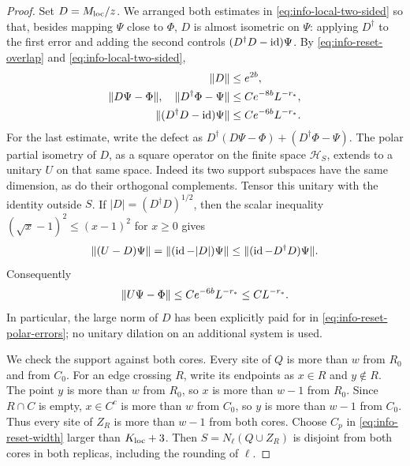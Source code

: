 \begin{proof}
Set $D=M_{\rm loc}/z$.  We arranged both estimates in
\eqref{eq:info-local-two-sided} so that, besides mapping $\Psi$ close
to $\Phi$, $D$ is almost isometric on $\Psi$: applying $D^\dagger$
to the first error and adding the second controls
$(D^\dagger D-\operatorname{id})\Psi$.  By
\eqref{eq:info-reset-overlap} and \eqref{eq:info-local-two-sided},
\begin{align}
 \lVert D\rVert&\le e^{2b},\\
 \lVert D\Psi-\Phi\rVert,\quad\lVert D^\dagger\Phi-\Psi\rVert
      &\le C e^{-8b}L^{-r_*},\\
 \lVert (D^\dagger D-\operatorname{id})\Psi\rVert
      &\le C e^{-6b}L^{-r_*}.
 \label{eq:info-reset-polar-errors}
\end{align}
For the last estimate, write the defect as
$D^\dagger(D\Psi-\Phi)+(D^\dagger\Phi-\Psi)$.
The polar partial isometry of $D$, as a square operator on the finite
space $\mathcal H_S$, extends to a unitary $U$ on that same space.
Indeed its two support subspaces have the same dimension, as do their
orthogonal complements.  Tensor this unitary with the identity outside
$S$.  If $|D|=(D^\dagger D)^{1/2}$, then the scalar inequality
$(\sqrt{x}-1)^2\le(x-1)^2$ for $x\ge0$ gives
\[
 \lVert (U-D)\Psi\rVert=\lVert (\operatorname{id}-|D|)\Psi\rVert
       \le\lVert (\operatorname{id}-D^\dagger D)\Psi\rVert.
\]
Consequently
\begin{equation}
 \lVert U\Psi-\Phi\rVert\le C e^{-6b}L^{-r_*}\le CL^{-r_*}.
 \label{eq:info-reset-unitary}
\end{equation}
In particular, the large norm of $D$ has been explicitly paid for in
\eqref{eq:info-reset-polar-errors}; no unitary dilation on an additional
system is used.

We check the support against both cores.  Every site of $Q$ is more
than $w$ from $R_0$ and from $C_0$.  For an edge crossing $R$, write its
endpoints as $x\in R$ and $y\notin R$.  The point $y$ is more than $w$
from $R_0$, so $x$ is more than $w-1$ from $R_0$.  Since $R\cap C$ is
empty, $x\in C^c$ is more than $w$ from $C_0$, so $y$ is more than
$w-1$ from $C_0$.  Thus every site of $Z_R$ is more than $w-1$ from
both cores.  Choose $C_p$ in \eqref{eq:info-reset-width} larger than
$K_{\rm loc}+3$.  Then $S=N_\ell(Q\cup Z_R)$ is disjoint from both cores in
both replicas, including the rounding of $\ell$.


\end{proof}
